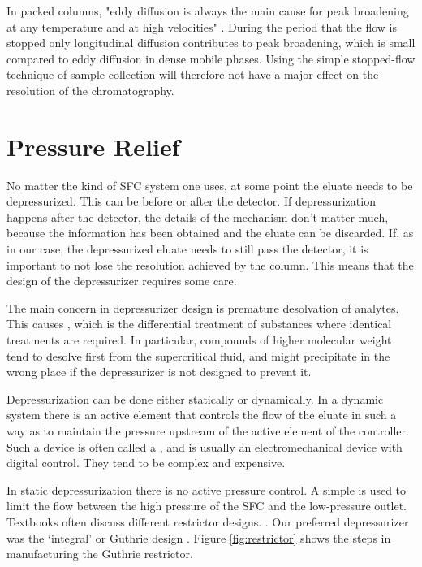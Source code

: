 In packed columns, "eddy diffusion is always the main cause for peak broadening
at any temperature and at high velocities" \autocite{Gritti2006}. During the
period that the flow is stopped only longitudinal diffusion contributes to peak
broadening, which is small compared to eddy diffusion in dense mobile phases.
Using the simple stopped-flow technique of sample collection will therefore not
have a major effect on the resolution of the \oneD chromatography.


\section{Pressure Relief}
\label{sec:Restrictor}

No matter the kind of SFC system one uses, at some point the eluate needs to be
depressurized. This can be before or after the detector. If depressurization
happens after the detector, the details of the mechanism don't matter much,
because the information has been obtained and the eluate can be discarded.
If, as in our case, the depressurized eluate needs to still pass the detector,
it is important to not lose the resolution achieved by the column. This means
that the design of the depressurizer requires some care.

The main concern in depressurizer design is premature desolvation of analytes.
This causes , which is the differential treatment of
substances where identical treatments are required. In particular, compounds of
higher molecular weight tend to desolve first from the supercritical fluid, and
might precipitate in the wrong place if the depressurizer is not designed to
prevent it. 

Depressurization can be done either statically or dynamically. In a dynamic
system there is an active element that controls the flow of the eluate in such a
way as to maintain the pressure upstream of the active element of the
controller. Such a device is often called a ,
and is usually an electromechanical device with digital control. They tend to
be complex and expensive.

In static depressurization there is no active pressure control. A simple
 is used to limit the flow between the high pressure of the
SFC and the low-pressure outlet. Textbooks often discuss different restrictor
designs. \autocite[The book by][provides an example.]{LuquedeCastro1994}. Our
preferred depressurizer was the `integral' or Guthrie design
\autocite{Guthrie1986}. Figure \ref{fig:restrictor} shows the steps in
manufacturing the Guthrie restrictor.

